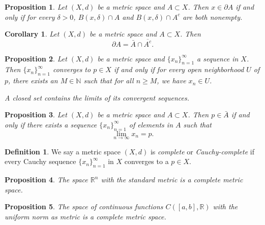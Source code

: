 \documentclass{article}
\newtheorem{corollary}{Corollary}[section]
\newtheorem{proposition}{Proposition}[section]
\theoremstyle{definition}
\newtheorem{definition}{Definition}[section]
\theoremstyle{remark}
\begin{document}
\begin{proposition} \label{prop:boundary_characterization}
Let \( (X, d) \) be a metric space and \( A \subset X \). Then \( x \in \partial A \) if and only if for every \( \delta > 0 \), \( B(x, \delta) \cap A \) and \( B(x, \delta) \cap A^c \) are both nonempty.
\end{proposition}

\begin{corollary} \label{cor:boundary_closure}
Let \( (X, d) \) be a metric space and \( A \subset X \). Then
\[
\partial A = \bar{A} \cap \overline{A^c}.
\]
\end{corollary}

\begin{proposition} \label{prop:sequence_convergence}
Let \( (X, d) \) be a metric space and \( \{ x_n \}_{n=1}^{\infty} \) a sequence in \( X \). Then \( \{ x_n \}_{n=1}^{\infty} \) converges to \( p \in X \) if and only if for every open neighborhood \( U \) of \( p \), there exists an \( M \in \mathbb{N} \) such that for all \( n \geq M \), we have \( x_n \in U \).

A closed set contains the limits of its convergent sequences.
\end{proposition}

\begin{proposition} \label{prop:sequence_closure}
Let \( (X, d) \) be a metric space and \( A \subset X \). Then \( p \in \bar{A} \) if and only if there exists a sequence \( \{ x_n \}_{n=1}^{\infty} \) of elements in \( A \) such that
\[
\lim_{n \to \infty} x_n = p.
\]
\end{proposition}


\begin{definition} \label{def:complete_space}
We say a metric space \( (X, d) \) is \textit{complete} or \textit{Cauchy-complete} if every Cauchy sequence \( \{x_n\}_{n=1}^{\infty} \) in \( X \) converges to a \( p \in X \).
\end{definition}

\begin{proposition} \label{prop:complete_Rn}
The space \( \mathbb{R}^n \) with the standard metric is a complete metric space.
\end{proposition}

\begin{proposition} \label{prop:complete_function_space}
The space of continuous functions \( C([a,b], \mathbb{R}) \) with the uniform norm as metric is a complete metric space.
\end{proposition}
\end{document}
